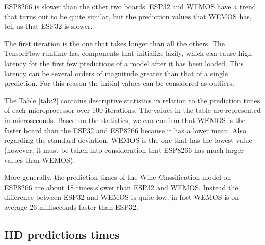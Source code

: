 \documentclass{article}
\begin{document}
ESP8266 is slower than the other two boards. ESP32 and WEMOS have a trend that turns out to be quite similar, but the prediction values that WEMOS has, tell us that ESP32 is slower.

The first iteration is the one that takes longer than all the others. The TensorFlow runtime has components that initialize lazily, which can cause high latency for the first few predictions of a model after it has been loaded. This latency can be several orders of magnitude greater than that of a single prediction. For this reason the initial values can be considered as outliers.

The Table \ref{tab:2} contains descriptive statistics in relation to the prediction times of each microprocessor over 100 iterations. The values in the table are represented in microseconds. Based on the statistics, we can confirm that WEMOS is the faster board than the ESP32 and ESP8266 because it has a lower mean. Also regarding the standard deviation, WEMOS is the one that has the lowest value (however, it must be taken into consideration that ESP8266 has much larger values than WEMOS). 

More generally, the prediction times of the Wine Classification model on ESP8266 are about 18 times slower than ESP32 and WEMOS. Instead the difference between ESP32 and WEMOS is quite low, in fact WEMOS is on average 26 milliseconds faster than ESP32.

\subsection{HD predictions times}
\end{document}
